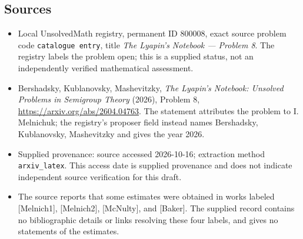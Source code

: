 \documentclass[11pt]{article}
\begin{document}
\subsection{Sources}
\begin{itemize}
\item Local UnsolvedMath registry, permanent ID \(800008\), exact source problem code \texttt{catalogue entry}, title \emph{The Lyapin's Notebook --- Problem 8}. The registry labels the problem open; this is a supplied status, not an independently verified mathematical assessment.
\item Bershadsky, Kublanovsky, Mashevitzky, \emph{The Lyapin's Notebook: Unsolved Problems in Semigroup Theory} (2026), Problem 8, \url{https://arxiv.org/abs/2604.04763}. The statement attributes the problem to I. Melnichuk; the registry's proposer field instead names Bershadsky, Kublanovsky, Mashevitzky and gives the year 2026.
\item Supplied provenance: source accessed 2026-10-16; extraction method \texttt{arxiv\_latex}. This access date is supplied provenance and does not indicate independent source verification for this draft.
\item The source reports that some estimates were obtained in works labeled [Melnich1], [Melnich2], [McNulty], and [Baker]. The supplied record contains no bibliographic details or links resolving these four labels, and gives no statements of the estimates.
\end{itemize}
\end{document}
